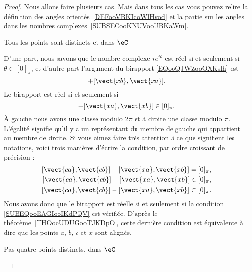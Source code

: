 \begin{proof}
    Nous allons faire plusieurs cas. Mais dans tous les cas vous pouvez relire la définition des angles orientés~\ref{DEFooVBKIooWlHvod} et la partie sur les angles dans les nombres complexes~\ref{SUBSECooKNUVooUBKaWm}.
    \begin{subproof}
        \item[Tous les points sont distincts et dans \( \eC\)]

            D'une part, nous savons que le nombre complexe \( r e^{i\theta}\) est réel si et seulement si \( \theta\in[0]_{\pi}\), et d'autre part l'argument du birapport \eqref{EQooQJWZooOXKslh} est
            \begin{equation}
                [\vect{ ca },\vect{ cb }]+[\vect{ xb },\vect{ xa }].
            \end{equation}
            Le birapport est réel si et seulement si
            \begin{equation}
                [\vect{ ca },\vect{ cb }]-[\vect{ xa },\vect{ xb }]\in[0]_{\pi}.
            \end{equation}
            À gauche nous avons une classe modulo \( 2\pi\) et à droite une classe modulo \( \pi\). L'égalité signifie qu'il y a un représentant du membre de gauche qui appartient au membre de droite. Si vous aimez faire très attention à ce que signifient les notations, voici trois manières d'écrire la condition, par ordre croissant de précision :
            \begin{subequations}
                \begin{align}
                    [\vect{ ca },\vect{ cb }]-[\vect{ xa },\vect{ xb }]=[0]_{\pi},\\
                    [\vect{ ca },\vect{ cb }]-[\vect{ xa },\vect{ xb }]\in[0]_{\pi},\\
                    [\vect{ ca },\vect{ cb }]-[\vect{ xa },\vect{ xb }]\subset[0]_{\pi}.        \label{SUBEQooEAGIooIKdPQV}
                \end{align}
            \end{subequations}
            Nous avons donc que le birapport est réelle si et seulement si la condition \eqref{SUBEQooEAGIooIKdPQV} est vérifiée. D'après le théorème~\ref{THOooUDUGooTJKDpO}, cette dernière condition est équivalente à dire que les points \( a\), \( b\), \( c\) et \( x\) sont alignés.

        \item[Pas quatre points distincts, dans \( \eC\)]


\end{subproof}
\end{proof}
